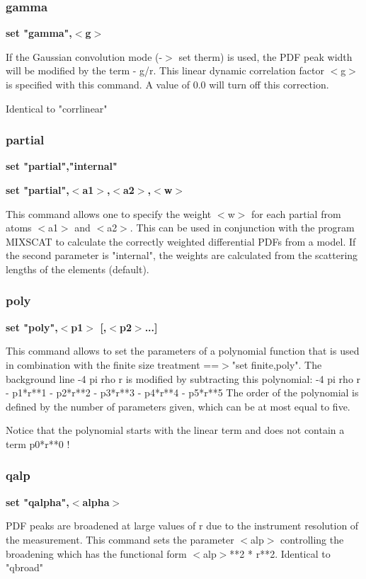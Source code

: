 \subsubsection{gamma}
{\bf set "gamma",$ <$g$> $ \par }
\par
\vspace{3pt}
If the Gaussian convolution mode (-$> $ set therm) is used, the PDF 
peak width will be modified by the term - g/r. This linear 
dynamic correlation factor $ <$g$> $ is specified with this command. A 
value of 0.0 will turn off this correction. 
\par
Identical to "corrlinear" 
\subsubsection{partial}
{\bf set "partial","internal" \par }
{\bf set "partial",$ <$a1$> $,$ <$a2$> $,$ <$w$> $ \par }
\par
\vspace{3pt}
This command allows one to specify the weight $ <$w$> $ for each partial 
from atoms $ <$a1$> $ and $ <$a2$> $. This can be used in conjunction with the 
program MIXSCAT to calculate the correctly weighted differential 
PDFs from a model. If the second parameter is "internal", the weights 
are calculated from the scattering lengths of the elements (default). 
\subsubsection{poly}
{\bf set "poly",$ <$p1$> $ [,$ <$p2$> $...] \par }
\par
\vspace{3pt}
This command allows to set the parameters of a polynomial 
function that is used in combination with the finite size 
treatment ==$> $"set finite,poly".  The background line 
-4 pi rho r is modified by subtracting this polynomial: 
-4 pi rho r - p1*r**1 - p2*r**2 - p3*r**3 - p4*r**4 - p5*r**5 
The order of the polynomial is defined by the number of parameters 
given, which can be at most equal to five. 
\par
Notice that the polynomial starts with the linear term and does 
not contain a term p0*r**0 ! 
\subsubsection{qalp}
{\bf set "qalpha",$ <$alpha$> $ \par }
\par
\vspace{3pt}
PDF peaks are broadened at large values of r due to the instrument 
resolution of the measurement. This command sets the parameter 
$ <$alp$> $ controlling the broadening which has the functional form 
$ <$alp$> $**2 * r**2. 
Identical to "qbroad" 
